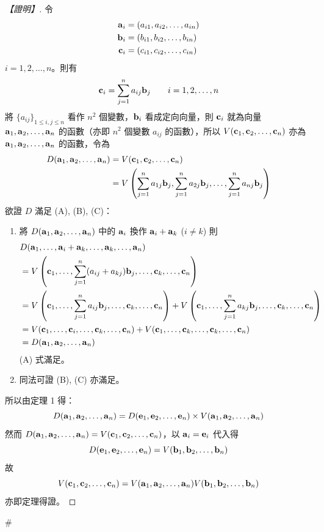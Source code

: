 \begin{proof}[【證明】]
令
\begin{align}
\vect{a}_i &= (a_{i1}, a_{i2}, \dots, a_{in}) \notag \\
\vect{b}_i &= (b_{i1}, b_{i2}, \dots, b_{in}) \label{eq:b6-1-6-3} \\
\vect{c}_i &= (c_{i1}, c_{i2}, \dots, c_{in}) \notag
\end{align}
$i=1, 2, \dots, n$。則有
\begin{equation}
\vect{c}_i = \sum_{j=1}^n a_{ij} \vect{b}_j \qquad i=1, 2, \dots, n \label{eq:b6-1-6-4}
\end{equation}
將 $\{ a_{ij} \}_{1 \le i, j \le n}$ 看作 $n^2$ 個變數，$\vect{b}_i$ 看成定向向量，則 $\vect{c}_i$ 就為向量 $\vect{a}_1, \vect{a}_2, \dots, \vect{a}_n$ 的函數（亦即 $n^2$ 個變數 $a_{ij}$ 的函數），所以 $V(\vect{c}_1, \vect{c}_2, \dots, \vect{c}_n)$ 亦為 $\vect{a}_1, \vect{a}_2, \dots, \vect{a}_n$ 的函數，令為
\begin{align}
D(\vect{a}_1, \vect{a}_2, \dots, \vect{a}_n) &= V(\vect{c}_1, \vect{c}_2, \dots, \vect{c}_n) \notag \\
&= V\left(\sum_{j=1}^n a_{1j}\vect{b}_j, \sum_{j=1}^n a_{2j}\vect{b}_j, \dots, \sum_{j=1}^n a_{nj}\vect{b}_j\right) \label{eq:b6-1-6-5}
\end{align}
欲證 $D$ 滿足 (A), (B), (C)：
\begin{enumerate}[label=(\roman*), leftmargin=2em]
  \item 將 $D(\vect{a}_1, \vect{a}_2, \dots, \vect{a}_n)$ 中的 $\vect{a}_i$ 換作 $\vect{a}_i + \vect{a}_k$ ($i \ne k$) 則
  \begin{align*}
  &D(\vect{a}_1, \dots, \vect{a}_i + \vect{a}_k, \dots, \vect{a}_k, \dots, \vect{a}_n) \\
  &= V\left(\vect{c}_1, \dots, \sum_{j=1}^n (a_{ij} + a_{kj})\vect{b}_j, \dots, \vect{c}_k, \dots, \vect{c}_n\right) \\
  &= V\left(\vect{c}_1, \dots, \sum_{j=1}^n a_{ij}\vect{b}_j, \dots, \vect{c}_k, \dots, \vect{c}_n\right) + V\left(\vect{c}_1, \dots, \sum_{j=1}^n a_{kj}\vect{b}_j, \dots, \vect{c}_k, \dots, \vect{c}_n\right) \\
  &= V(\vect{c}_1, \dots, \vect{c}_i, \dots, \vect{c}_k, \dots, \vect{c}_n) + V(\vect{c}_1, \dots, \vect{c}_k, \dots, \vect{c}_k, \dots, \vect{c}_n) \\
  &= D(\vect{a}_1, \vect{a}_2, \dots, \vect{a}_n)
  \end{align*}
  (A) 式滿足。
  \item 同法可證 (B), (C) 亦滿足。
\end{enumerate}
所以由定理 1 得：
\[ D(\vect{a}_1, \vect{a}_2, \dots, \vect{a}_n) = D(\vect{e}_1, \vect{e}_2, \dots, \vect{e}_n) \times V(\vect{a}_1, \vect{a}_2, \dots, \vect{a}_n) \]
然而 $D(\vect{a}_1, \vect{a}_2, \dots, \vect{a}_n) = V(\vect{c}_1, \vect{c}_2, \dots, \vect{c}_n)$，以 $\vect{a}_i = \vect{e}_i$ 代入得
\[ D(\vect{e}_1, \vect{e}_2, \dots, \vect{e}_n) = V(\vect{b}_1, \vect{b}_2, \dots, \vect{b}_n) \]
故
\[ V(\vect{c}_1, \vect{c}_2, \dots, \vect{c}_n) = V(\vect{a}_1, \vect{a}_2, \dots, \vect{a}_n) V(\vect{b}_1, \vect{b}_2, \dots, \vect{b}_n) \]
亦即定理得證。\end{proof}\hfill$\#$

